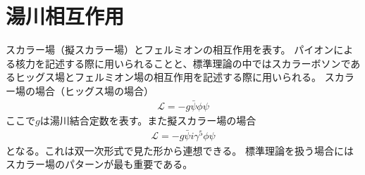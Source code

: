 \section{湯川相互作用}
スカラー場（擬スカラー場）とフェルミオンの相互作用を表す。
パイオンによる核力を記述する際に用いられることと、標準理論の中ではスカラーボソンであるヒッグス場とフェルミオン場の相互作用を記述する際に用いられる。
スカラー場の場合（ヒッグス場の場合）
\begin{eqnarray}
  \mathcal{L} = -g\bar{\psi}\phi\psi
\end{eqnarray}
ここで$g$は湯川結合定数を表す。また擬スカラー場の場合
\begin{eqnarray}
  \mathcal{L} = -g\bar{\psi}i\gamma^5\phi\psi
\end{eqnarray}
となる。これは双一次形式で見た形から連想できる。
標準理論を扱う場合にはスカラー場のパターンが最も重要である。


